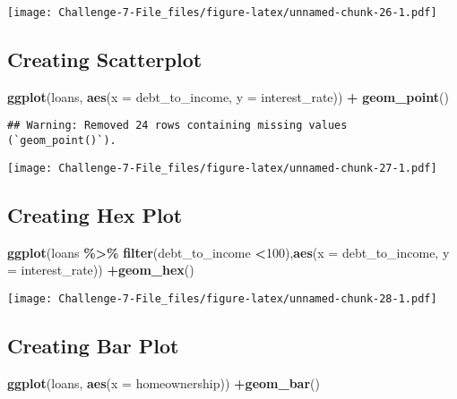 \documentclass[
]{article}
\newenvironment{Shaded}{\begin{snugshade}}{\end{snugshade}}
\newcommand{\AttributeTok}[1]{\textcolor[rgb]{0.13,0.29,0.53}{#1}}
\newcommand{\DecValTok}[1]{\textcolor[rgb]{0.00,0.00,0.81}{#1}}
\newcommand{\FunctionTok}[1]{\textcolor[rgb]{0.13,0.29,0.53}{\textbf{#1}}}
\newcommand{\NormalTok}[1]{#1}
\newcommand{\SpecialCharTok}[1]{\textcolor[rgb]{0.81,0.36,0.00}{\textbf{#1}}}
\begin{document}
\texttt{[image: Challenge-7-File\_files/figure-latex/unnamed-chunk-26-1.pdf]}

\hypertarget{creating-scatterplot}{%
\subsection{Creating Scatterplot}\label{creating-scatterplot}}

\begin{Shaded}
\begin{Highlighting}[]
\FunctionTok{ggplot}\NormalTok{(loans, }\FunctionTok{aes}\NormalTok{(}\AttributeTok{x =}\NormalTok{ debt\_to\_income, }\AttributeTok{y =}\NormalTok{ interest\_rate)) }\SpecialCharTok{+}
\FunctionTok{geom\_point}\NormalTok{()}
\end{Highlighting}
\end{Shaded}

\begin{verbatim}
## Warning: Removed 24 rows containing missing values (`geom_point()`).
\end{verbatim}

\texttt{[image: Challenge-7-File\_files/figure-latex/unnamed-chunk-27-1.pdf]}

\hypertarget{creating-hex-plot}{%
\subsection{Creating Hex Plot}\label{creating-hex-plot}}

\begin{Shaded}
\begin{Highlighting}[]
\FunctionTok{ggplot}\NormalTok{(loans }\SpecialCharTok{\%\textgreater{}\%} \FunctionTok{filter}\NormalTok{(debt\_to\_income }\SpecialCharTok{\textless{}}\DecValTok{100}\NormalTok{),}\FunctionTok{aes}\NormalTok{(}\AttributeTok{x =}\NormalTok{ debt\_to\_income, }\AttributeTok{y =}\NormalTok{ interest\_rate)) }\SpecialCharTok{+}\FunctionTok{geom\_hex}\NormalTok{()}
\end{Highlighting}
\end{Shaded}

\texttt{[image: Challenge-7-File\_files/figure-latex/unnamed-chunk-28-1.pdf]}

\hypertarget{creating-bar-plot}{%
\subsection{Creating Bar Plot}\label{creating-bar-plot}}

\begin{Shaded}
\begin{Highlighting}[]
\FunctionTok{ggplot}\NormalTok{(loans, }\FunctionTok{aes}\NormalTok{(}\AttributeTok{x =}\NormalTok{ homeownership)) }\SpecialCharTok{+}\FunctionTok{geom\_bar}\NormalTok{()}
\end{Highlighting}
\end{Shaded}
\end{document}
